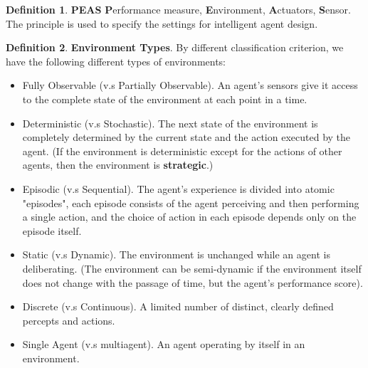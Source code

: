 \documentclass{article}
\theoremstyle{definition}
\newtheorem{defi}{Definition}[section]
\begin{document}
\begin{defi}
\textbf{PEAS} \textbf{P}erformance measure, \textbf{E}nvironment, \textbf{A}ctuators, \textbf{S}ensor. The principle is used to specify the settings for intelligent agent design.
\end{defi}

\begin{defi}
\textbf{Environment Types}. By different classification criterion, we have the following different types of environments:
\begin{itemize}
    \item Fully Observable (v.s Partially Observable). An agent's sensors give it access to the complete state of the environment at each point in a time.
    \item Deterministic (v.s Stochastic). The next state of the environment is completely determined by the current state and the action executed by the agent. (If the environment is deterministic except for the actions of other agents, then the environment is \textbf{strategic}.)
    \item Episodic (v.s Sequential). The agent's experience is divided into atomic "episodes", each episode consists of the agent perceiving and then performing a single action, and the choice of action in each episode depends only on the episode itself.
    \item Static (v.s Dynamic). The environment is unchanged while an agent is deliberating. (The environment can be semi-dynamic if the environment itself does not change with the passage of time, but the agent's performance score).
    \item Discrete (v.s Continuous). A limited number of distinct, clearly defined percepts and actions.
    \item Single Agent (v.s multiagent). An agent operating by itself in an environment.
\end{itemize}
\end{defi}
\end{document}
